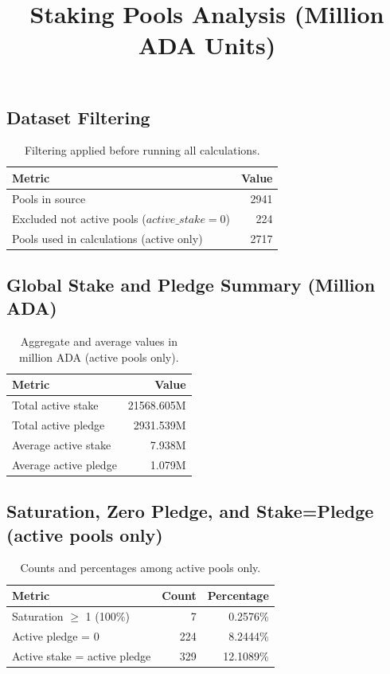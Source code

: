 \documentclass[11pt]{article}
\title{Staking Pools Analysis (Million ADA Units)}
\author{}
\date{}
\begin{document}
\maketitle
\subsection*{Dataset Filtering}
\begin{table}[h]
\centering
\begin{tabular}{lr}
\toprule
Metric & Value \\
\midrule
Pools in source & 2941 \\
Excluded not active pools ($active\_stake=0$) & 224 \\
Pools used in calculations (active only) & 2717 \\
\bottomrule
\end{tabular}
\caption{Filtering applied before running all calculations.}
\end{table}

\subsection*{Global Stake and Pledge Summary (Million ADA)}
\begin{table}[h]
\centering
\begin{tabular}{lr}
\toprule
Metric & Value \\
\midrule
Total active stake & 21568.605M \\
Total active pledge & 2931.539M \\
Average active stake & 7.938M \\
Average active pledge & 1.079M \\
\bottomrule
\end{tabular}
\caption{Aggregate and average values in million ADA (active pools only).}
\end{table}

\subsection*{Saturation, Zero Pledge, and Stake=Pledge (active pools only)}
\begin{table}[h]
\centering
\begin{tabular}{lrr}
\toprule
Metric & Count & Percentage \\
\midrule
Saturation $\geq$ 1 (100\%) & 7 & 0.2576\% \\
Active pledge = 0 & 224 & 8.2444\% \\
Active stake = active pledge & 329 & 12.1089\% \\
\bottomrule
\end{tabular}
\caption{Counts and percentages among active pools only.}
\end{table}
\end{document}
